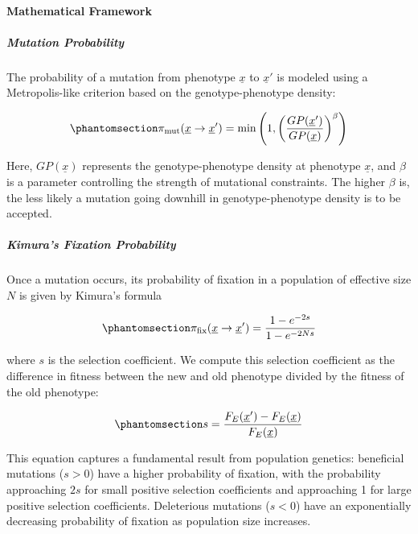 \documentclass[
]{scrartcl}
\let\oldparagraph\paragraph
\renewcommand{\paragraph}[1]{\oldparagraph{#1}\mbox{}}
\let\oldsubparagraph\subparagraph
\renewcommand{\subparagraph}[1]{\oldsubparagraph{#1}\mbox{}}
\begin{document}
\begin{refsection}
\paragraph{Mathematical Framework}\label{mathematical-framework}

\subparagraph{Mutation Probability}\label{mutation-probability}

The probability of a mutation from phenotype \(\underline{x}\) to
\(\underline{x}'\) is modeled using a Metropolis-like criterion based on
the genotype-phenotype density:

\begin{equation}\phantomsection\label{eq-mutation-probability}{
\pi_{\text{mut}}(\underline{x} \to \underline{x}') = 
\min\left(1, \left(\frac{GP(\underline{x}')}{GP(\underline{x})}\right)^{\beta}\right)
}\end{equation}

Here, \(GP(\underline{x})\) represents the genotype-phenotype density at
phenotype \(\underline{x}\), and \(\beta\) is a parameter controlling
the strength of mutational constraints. The higher \(\beta\) is, the
less likely a mutation going downhill in genotype-phenotype density is
to be accepted.

\subparagraph{Kimura's Fixation
Probability}\label{kimuras-fixation-probability}

Once a mutation occurs, its probability of fixation in a population of
effective size \(N\) is given by Kimura's formula

\begin{equation}\phantomsection\label{eq-kimura-fixation-probability}{
\pi_{\text{fix}}(\underline{x} \to \underline{x}') = 
\frac{1 - e^{-2s}}{1 - e^{-2Ns}}
}\end{equation}

where \(s\) is the selection coefficient. We compute this selection
coefficient as the difference in fitness between the new and old
phenotype divided by the fitness of the old phenotype:

\begin{equation}\phantomsection\label{eq-selection-coefficient}{
s = \frac{F_E(\underline{x}') - F_E(\underline{x})}{F_E(\underline{x})}
}\end{equation}

This equation captures a fundamental result from population genetics:
beneficial mutations (\(s > 0\)) have a higher probability of fixation,
with the probability approaching \(2s\) for small positive selection
coefficients and approaching 1 for large positive selection
coefficients. Deleterious mutations (\(s < 0\)) have an exponentially
decreasing probability of fixation as population size increases.


\end{refsection}
\end{document}
